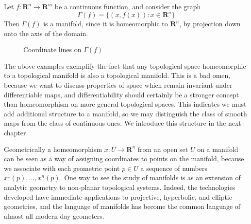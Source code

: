 \begin{example}
    Let $f: \mathbf{R}^n \to \mathbf{R}^m$ be a continuous function, and consider the graph
    \[ \Gamma(f) = \{ (x, f(x)) : x \in \mathbf{R}^n \} \]
    Then $\Gamma(f)$ is a manifold, since it is homeomorphic to $\mathbf{R}^n$, by projection down onto the axis of the domain.
\end{example}

\begin{figure}
\begin{center}
\caption{Coordinate lines on $\Gamma(f)$}
\end{center}
\end{figure}

The above examples exemplify the fact that any topological space homeomorphic to a topological manifold is also a topological manifold. This is a bad omen, because we want to discuss properties of space which remain invariant under differentiable maps, and differentiability should certainly be a stronger concept than homeomorphism on more general topological spaces. This indicates we must add additional structure to a manifold, so we may distinguish the class of smooth maps from the class of continuous ones. We introduce this structure in the next chapter.

Geometrically a homeomorphism $x: U \to \mathbf{R}^n$ from an open set $U$ on a manifold can be seen as a way of assigning coordinates to points on the manifold, because we associate with each geometric point $p \in U$ a sequence of numbers $x^1(p), \dots, x^n(p)$. One way to see the study of manifolds is as an extension of analytic geometry to non-planar topological systems. Indeed, the technologies developed have immediate applications to projective, hyperbolic, and elliptic geometries, and the language of manifolds has become the common language of almost all modern day geometers.

